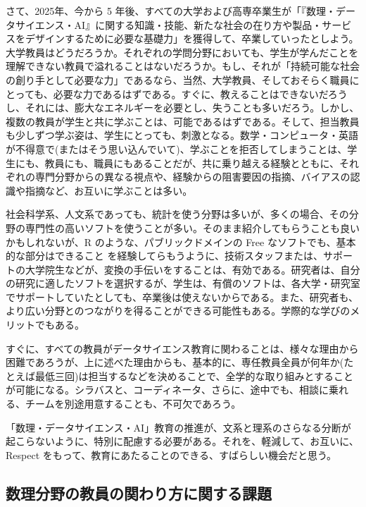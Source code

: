 \documentclass[
]{book}
\theoremstyle{definition}
\theoremstyle{definition}
\theoremstyle{definition}
\theoremstyle{definition}
\theoremstyle{remark}
\begin{document}
さて、2025年、今から 5 年後、すべての大学および高専卒業生が「『数理・データサイエンス・AI』に関する知識・技能、新たな社会の在り方や製品・サービスをデザインするために必要な基礎力」を獲得して、卒業していったとしよう。大学教員はどうだろうか。それぞれの学問分野においても、学生が学んだことを理解できない教員で溢れることはないだろうか。もし、それが「持続可能な社会の創り手として必要な力」であるなら、当然、大学教員、そしておそらく職員にとっても、必要な力であるはずである。すぐに、教えることはできないだろうし、それには、膨大なエネルギーを必要とし、失うことも多いだろう。しかし、複数の教員が学生と共に学ぶことは、可能であるはずである。そして、担当教員も少しずつ学ぶ姿は、学生にとっても、刺激となる。数学・コンピュータ・英語が不得意で(またはそう思い込んでいて)、学ぶことを拒否してしまうことは、学生にも、教員にも、職員にもあることだが、共に乗り越える経験とともに、それぞれの専門分野からの異なる視点や、経験からの阻害要因の指摘、バイアスの認識や指摘など、お互いに学ぶことは多い。

社会科学系、人文系であっても、統計を使う分野は多いが、多くの場合、その分野の専門性の高いソフトを使うことが多い。そのまま紹介してもらうことも良いかもしれないが、R のような、パブリックドメインの Free なソフトでも、基本的な部分はできること を経験してらもうように、技術スタッフまたは、サポートの大学院生などが、変換の手伝いをすることは、有効である。研究者は、自分の研究に適したソフトを選択するが、学生は、有償のソフトは、各大学・研究室でサポートしていたとしても、卒業後は使えないからである。また、研究者も、より広い分野とのつながりを得ることができる可能性もある。学際的な学びのメリットでもある。

すぐに、すべての教員がデータサイエンス教育に関わることは、様々な理由から困難であろうが、上に述べた理由からも、基本的に、専任教員全員が何年か(たとえば最低三回)は担当するなどを決めることで、全学的な取り組みとすることが可能になる。シラバスと、コーディネータ、さらに、途中でも、相談に乗れる、チームを別途用意することも、不可欠であろう。

「数理・データサイエンス・AI」教育の推進が、文系と理系のさらなる分断が起こらないように、特別に配慮する必要がある。それを、軽減して、お互いに、Respect をもって、教育にあたることのできる、すばらしい機会だと思う。

\hypertarget{ux6570ux7406ux5206ux91ceux306eux6559ux54e1ux306eux95a2ux308fux308aux65b9ux306bux95a2ux3059ux308bux8ab2ux984c}{%
\subsection{数理分野の教員の関わり方に関する課題}\label{ux6570ux7406ux5206ux91ceux306eux6559ux54e1ux306eux95a2ux308fux308aux65b9ux306bux95a2ux3059ux308bux8ab2ux984c}}
\end{document}
